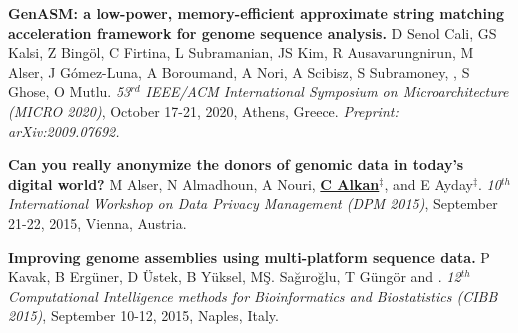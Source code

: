 \vspace{-.2cm}
{\bf GenASM: a low-power, memory-efficient approximate string matching acceleration framework for genome sequence analysis.}
D Senol Cali, GS Kalsi, Z Bingöl, C Firtina, L Subramanian,  JS Kim, R Ausavarungnirun, M Alser,
 J Gómez-Luna, A Boroumand, A Nori, A Scibisz, S Subramoney, \calkan{}, S Ghose, O Mutlu.
{\em 53$^{rd}$ IEEE/ACM International Symposium on Microarchitecture (MICRO 2020)}, October 17-21, 2020, Athens, Greece. \textit{Preprint: arXiv:2009.07692.}

\vspace{-.2cm}
{\bf Can you really anonymize the donors of genomic data in today's digital world?}
M Alser, N Almadhoun, A Nouri, {\bf {\underline{C Alkan}}}$^\ddag$, and E Ayday$^\ddag$. 
{\em 10$^{th}$ International Workshop on Data Privacy Management (DPM 2015)}, 
 September 21-22, 2015, Vienna, Austria.

\vspace{-.2cm}

{\bf Improving genome assemblies using multi-platform sequence data.}
P Kavak, B Ergüner, D Üstek, B Yüksel, MŞ. Sağıroğlu, T Güngör and \calkan{}.
{\em 12$^{th}$ Computational Intelligence methods for Bioinformatics and Biostatistics (CIBB 2015)}, 
 September 10-12, 2015, Naples, Italy.






